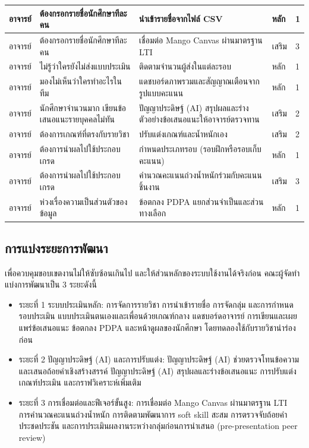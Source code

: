 \begin{xltabular}{\textwidth}{|P{0.09\textwidth}|Y|Y|P{0.09\textwidth}|P{0.05\textwidth}|}
อาจารย์ & ต้องกรอกรายชื่อนักศึกษาทีละคน & นำเข้ารายชื่อจากไฟล์ CSV & หลัก & 1 \\ \hline
อาจารย์ & ต้องกรอกรายชื่อนักศึกษาทีละคน & เชื่อมต่อ Mango Canvas ผ่านมาตรฐาน LTI & เสริม & 3 \\ \hline
อาจารย์ & ไม่รู้ว่าใครยังไม่ส่งแบบประเมิน & ติดตามจำนวนผู้ส่งในแต่ละรอบ & หลัก & 1 \\ \hline
อาจารย์ & มองไม่เห็นว่าใครทำอะไรในทีม & แดชบอร์ดภาพรวมและสัญญาณเตือนจากรูปแบบคะแนน & หลัก & 1 \\ \hline
อาจารย์ & นักศึกษาจำนวนมาก เขียนข้อเสนอแนะรายบุคคลไม่ทัน & ปัญญาประดิษฐ์ (AI) สรุปผลและร่างตัวอย่างข้อเสนอแนะให้อาจารย์ตรวจทาน & เสริม & 2 \\ \hline
อาจารย์ & ต้องการเกณฑ์ที่ตรงกับรายวิชา & ปรับแต่งเกณฑ์และน้ำหนักเอง & เสริม & 2 \\ \hline
อาจารย์ & ต้องการนำผลไปใช้ประกอบเกรด & กำหนดประเภทรอบ (รอบฝึกหรือรอบเก็บคะแนน) & หลัก & 1 \\ \hline
อาจารย์ & ต้องการนำผลไปใช้ประกอบเกรด & คำนวณคะแนนถ่วงน้ำหนักร่วมกับคะแนนชิ้นงาน & เสริม & 3 \\ \hline
อาจารย์ & ห่วงเรื่องความเป็นส่วนตัวของข้อมูล & ข้อตกลง PDPA แยกส่วนจำเป็นและส่วนทางเลือก & หลัก & 1 \\ \hline
\end{xltabular}

\subsection{การแบ่งระยะการพัฒนา}\label{sec:3.3.2}

เพื่อควบคุมขอบเขตงานไม่ให้ซับซ้อนเกินไป และให้ส่วนหลักของระบบใช้งานได้จริงก่อน คณะผู้จัดทำแบ่งการพัฒนาเป็น 3 ระยะดังนี้

\begin{itemize}
  \item ระยะที่ 1 ระบบประเมินหลัก: การจัดการรายวิชา การนำเข้ารายชื่อ การจัดกลุ่ม และการกำหนดรอบประเมิน แบบประเมินตนเองและเพื่อนด้วยเกณฑ์กลาง แดชบอร์ดอาจารย์ การเขียนและเผยแพร่ข้อเสนอแนะ ข้อตกลง PDPA และหน้าดูผลของนักศึกษา โดยทดลองใช้กับรายวิชานำร่องก่อน
  \item ระยะที่ 2 ปัญญาประดิษฐ์ (AI) และการปรับแต่ง: ปัญญาประดิษฐ์ (AI) ช่วยตรวจโทนข้อความและเสนอถ้อยคำเชิงสร้างสรรค์ ปัญญาประดิษฐ์ (AI) สรุปผลและร่างข้อเสนอแนะ การปรับแต่งเกณฑ์ประเมิน และกราฟวิเคราะห์เพิ่มเติม
  \item ระยะที่ 3 การเชื่อมต่อและฟีเจอร์ขั้นสูง: การเชื่อมต่อ Mango Canvas ผ่านมาตรฐาน LTI~\cite{ims2019lti} การคำนวณคะแนนถ่วงน้ำหนัก การติดตามพัฒนาการ soft skill สะสม การตรวจจับถ้อยคำประชดประชัน และการประเมินผลงานระหว่างกลุ่มก่อนการนำเสนอ (pre-presentation peer review)
\end{itemize}

